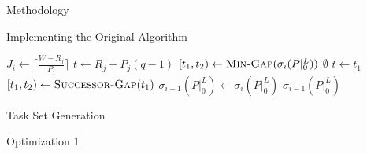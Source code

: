 \documentclass{article}
\begin{document}
\begin{section}{Methodology}
\begin{subsection}{Implementing the Original Algorithm}
    \begin{algorithm}
      \caption{Gap-Tranformation Algorithm}\label{gapxfrm1}
      \begin{algorithmic}[2]
          \State $J_{i} \gets \lceil\frac{W - R_{j}}{P_{j}}\rceil$
            \State $t \gets R_{j} + P_{j}(q-1)$
            \State $[t_{1},t_{2}) \gets \Call{Min-Gap}{\sigma_{i}(P|_{0}^{L})}$
            \While{$[t_{1},t_{2}) \not= \Call{Nil}{\sigma_{i}(P|_{0}^{L})}$}
                \State \Return $\emptyset$
              \EndIf
                \State $t \gets t_{1}$
              \EndIf
                \State \Call{Gap-Delete}{$\sigma_{i}(P|_{0}^{L}), [t_{1},t_{2})$}
                  \State \Call{Gap-Insert}{$\sigma_{i}(P|_{0}^{L}), [t_{1},t)$}
                  \ExitWhile
                \EndIf
                  \State \Call{Gap-Insert}{$\sigma_{i}(P|_{0}^{L}), [t_{1},t)$}
                  \State \Call{Gap-Insert}{$\sigma_{i}(P|_{0}^{L}), [t + C_{j},t_{2})$}
                  \ExitWhile
                \EndIf
                  \State \Call{Gap-Insert}{$\sigma_{i}(P|_{0}^{L}), [t_{1},t)$}
                \EndIf                  
              \EndIf
              \State $[t_{1},t_{2}) \gets \Call{Successor-Gap}{t_{1}}$
            \EndWhile
          \EndFor
          \State $\sigma_{i-1}(P|_{0}^{L}) \gets \sigma_{i}(P|_{0}^{L})$
          \State \Return $\sigma_{i-1}(P|_{0}^{L})$
        \EndFunction
      \end{algorithmic}
      \end{algorithm}
        
  \end{subsection}

  \begin{subsection}{Task Set Generation}
  \end{subsection}

  \begin{subsection}{Optimization 1}


\end{subsection}
\end{section}
\end{document}
